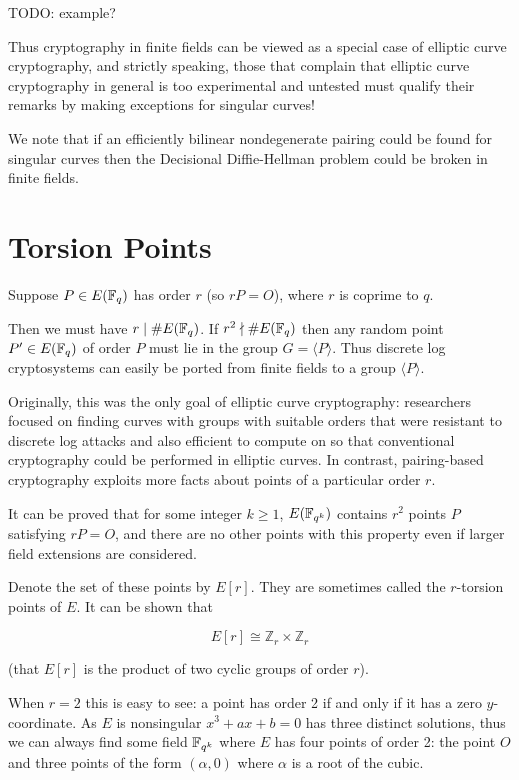 TODO: example?

Thus cryptography in finite fields can be viewed as a special
case of elliptic curve cryptography, and strictly speaking,
those that complain that elliptic curve cryptography in general
is too experimental and untested must qualify
their remarks by making exceptions for singular curves!

We note that if an efficiently bilinear nondegenerate pairing could be found
for singular curves then the Decisional Diffie-Hellman problem could be broken
in finite fields.

\section {Torsion Points}

Suppose $P\in E(\mathbb{F}_q)$ has order $r$ (so $r P = O$),
where $r$ is coprime to $q$.

Then we must have $r \mid \#E(\mathbb{F}_q)$.
If $r^2 \nmid \#E(\mathbb{F}_q)$ then any random point $P' \in E(\mathbb{F}_q)$
of order $P$ must lie in the group $G = \langle P \rangle$.
Thus discrete log cryptosystems can easily be ported from finite fields
to a group $\langle P \rangle$.

Originally, this was the only goal of elliptic curve cryptography:
researchers focused on finding curves with groups with
suitable orders that were resistant to discrete log attacks and also
efficient to compute on so that conventional cryptography could be
performed in elliptic curves.
In contrast, pairing-based cryptography exploits more facts
about points of a particular order $r$.

It can be proved that for some integer $k \ge 1$,
$E(\mathbb{F}_{q^k})$ contains $r^2$ points $P$ satisfying $r P = O$,
and there are no other points with this property even if larger field
extensions are considered.

Denote the set of these points by $E[r]$. They are sometimes called the
$r$-torsion points of $E$. It can be shown that

\[ E[r] \cong \mathbb{Z}_r \times \mathbb{Z}_r \]

(that $E[r]$ is the product of two cyclic groups of order $r$).

When $r=2$ this is easy to see: a point has order 2 if and only if it has
a zero $y$-coordinate. As $E$ is nonsingular
$x^3 + ax + b = 0$ has three distinct solutions, thus we can always find
some field $\mathbb{F}_{q^k}$ where $E$ has
four points of order 2: the point $O$ and three points of the form
$(\alpha, 0)$ where $\alpha$ is a root of the cubic.

